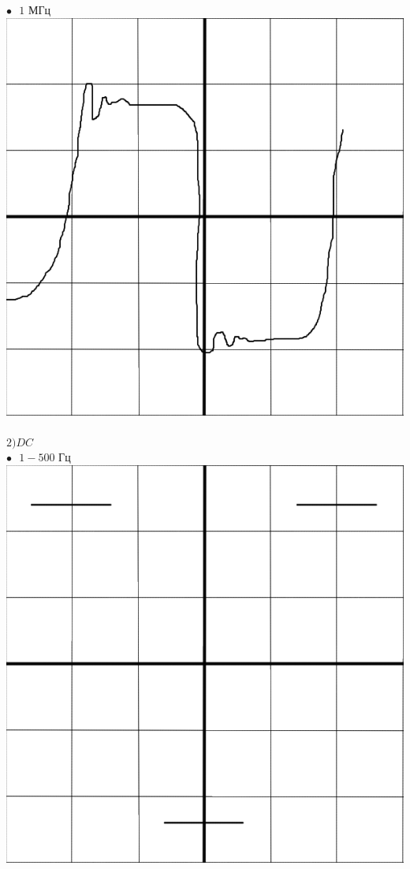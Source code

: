 \documentclass[a4paper,12pt]{article} %
\begin{document}
$\bullet\text{ } 1\text{ МГц }\text{ }\text{ }\text{ }\text{ }\text{ }$
\includegraphics[scale=0.28]{1000000}\\\\
$2)DC$\\
$\bullet\text{ } 1 - 500\text{ Гц }$
\includegraphics[scale=0.28]{1000}
\end{document}

